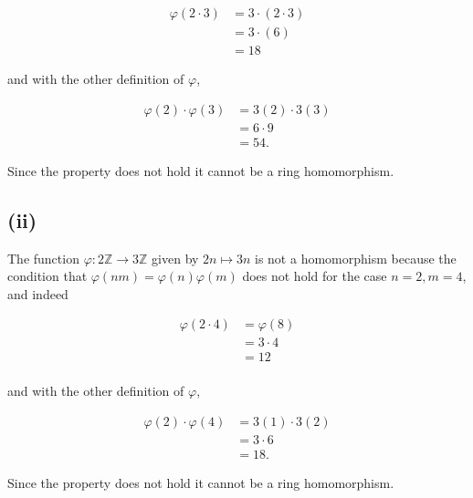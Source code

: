 \documentclass{article}
\begin{document}
      \begin{align*}
        \varphi(2 \cdot 3) &= 3 \cdot (2 \cdot 3)  \\
        &= 3 \cdot(6)\\
        &= 18
      \end{align*}

      \noindent and with the other definition of $\varphi$,
      
      \begin{align*}
        \varphi(2) \cdot \varphi(3) &= 3(2) \cdot 3(3)  \\
        &= 6 \cdot 9\\
        &= 54.
      \end{align*}

      \noindent Since the property does not hold it cannot be a ring homomorphism.

      \subsection*{(ii)}
      The function $\varphi: 2\mathbb{Z} \rightarrow 3\mathbb{Z}$ given by $2n \mapsto 3n$ is not a homomorphism because the condition that $\varphi(nm) = \varphi(n)\varphi(m)$ does not hold for the case $n = 2, m=4$, and indeed

      \begin{align*}
        \varphi(2 \cdot 4) &= \varphi(8)  \\
        &= 3 \cdot 4\\
        &= 12\\
      \end{align*}

      \noindent and with the other definition of $\varphi$,
      
      \begin{align*}
        \varphi(2) \cdot \varphi(4) &= 3(1) \cdot 3(2)  \\
        &= 3 \cdot 6\\
        &= 18.
      \end{align*}

      \noindent Since the property does not hold it cannot be a ring homomorphism.
\end{document}

